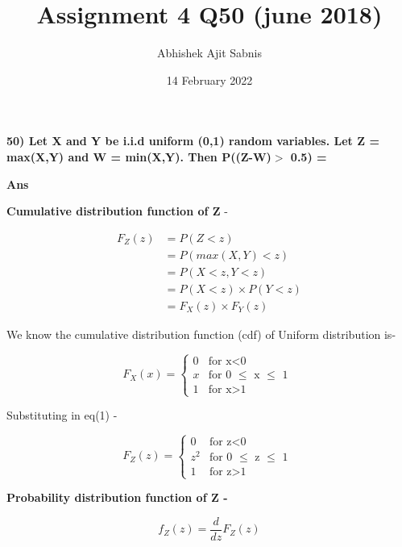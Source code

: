 \documentclass{article}
\title{\textbf{Assignment 4 Q50 (june 2018)}}
\author{Abhishek Ajit Sabnis}
\date{14 February 2022}
\begin{document}
\maketitle

\textbf{50) Let X and Y be i.i.d uniform (0,1) random variables. Let Z = max(X,Y) and W = min(X,Y). Then P((Z-W)$>$ 0.5) = }

\vspace{0.5cm}

\textbf{Ans} 

\textbf{Cumulative distribution function of Z} -

\begin{equation} 
\begin{split}
F_Z(z) & = P(Z<z)  \\
 & = P(max(X,Y) <z ) \\
 & = P(X<z, Y<z) \\
 & =  P(X<z)\times P(Y<z) \\
 & =  F_X(z) \times F_Y(z)
\end{split}
\end{equation}

We know the cumulative distribution function (cdf) of Uniform distribution is-

\begin{equation}
  F_X(x) =
    \begin{cases}
      0 & \text{for x$<$0}\\
      x & \text{for 0 $\leq$ x $\leq$ 1 }\\
      1 & \text{for x$>$1}
    \end{cases}       
\end{equation}

Substituting in eq(1) - 

\begin{equation}
  F_Z(z) =
    \begin{cases}
      0 & \text{for z$<$0}\\
      z^2 & \text{for 0 $\leq$ z $\leq$ 1 }\\
      1 & \text{for z$>$1}
    \end{cases}       
\end{equation}



\vspace{0.3cm}

\textbf{Probability distribution function of Z -}

\begin{equation}
    f_Z(z) = \frac{d}{dz} F_Z(z)
\end{equation}
\end{document}

